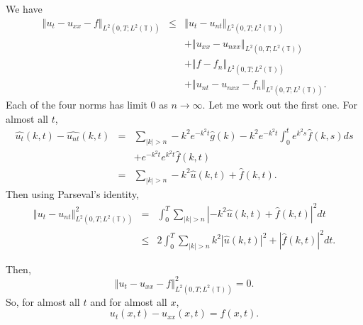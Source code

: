 \documentclass{article}
\newcommand{\norm}[1]{\left\Vert #1 \right\Vert}
\begin{document}
We have
\begin{eqnarray*}
\norm{u_t-u_{xx}-f}_{L^2(0,T;L^2(\mathbb{T}))}&\leq&\norm{u_t-u_{nt}}_{L^2(0,T;L^2(\mathbb{T}))}\\
&&+\norm{u_{xx}-u_{nxx}}_{L^2(0,T;L^2(\mathbb{T}))}\\
&&+\norm{f-f_n}_{L^2(0,T;L^2(\mathbb{T}))}\\
&&+\norm{u_{nt}-u_{nxx}-f_n}_{L^2(0,T;L^2(\mathbb{T}))}.
\end{eqnarray*}
Each of the four norms has limit $0$ as $n \to \infty$. Let me work out the first one.
For almost all $t$,
\begin{eqnarray*}
\widehat{u_t}(k,t)-\widehat{u_{nt}}(k,t)&=&\sum_{|k|>n} -k^2 e^{-k^2 t}\hat{g}(k)-k^2 e^{-k^2 t}\int_0^t e^{k^2 s}\hat{f}(k,s) ds\\
&&+e^{-k^2 t} e^{k^2 t} \hat{f}(k,t)\\
&=&\sum_{|k|>n} -k^2 \hat{u}(k,t) + \hat{f}(k,t).
\end{eqnarray*}
Then using Parseval's identity,
\begin{eqnarray*}
\norm{u_t-u_{nt}}_{L^2(0,T;L^2(\mathbb{T}))}^2&=&\int_0^T \sum_{|k|>n} | -k^2 \hat{u}(k,t) + \hat{f}(k,t)|^2 dt \\
&\leq&2\int_0^T \sum_{|k|>n} k^2 |\hat{u}(k,t)|^2 + |\hat{f}(k,t)|^2 dt.
\end{eqnarray*}


 Then,
\[
\norm{u_t-u_{xx}-f}_{L^2(0,T;L^2(\mathbb{T}))}^2=0.
\]
So, for almost all $t$ and for almost all $x$,
\[
u_t(x,t)-u_{xx}(x,t)=f(x,t).
\]
\end{document}
